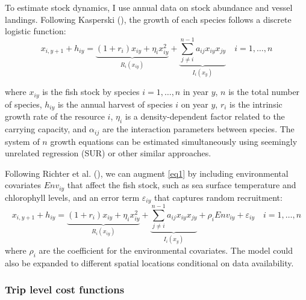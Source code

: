 \documentclass[
  11pt,
]{article}
\begin{document}
To estimate stock dynamics, I use annual data on stock abundance and
vessel landings. Following Kasperski
(), the growth of each species
follows a discrete logistic function: \begin{equation}
x_{i,y+1} + h_{iy} = \underbrace{(1 + r_i)x_{iy} + \eta_i x_{iy}^2}_{R_i(x_{iy})} + \underbrace{\sum_{j \neq i}^{n-1} a_{ij} x_{iy} x_{jy}}_{I_i(x_y)} \quad i=1,\ldots,n
\label{eq1}
\end{equation}

where \(x_{iy}\) is the fish stock by species \(i=1,\ldots,n\) in year
\(y\), \(n\) is the total number of species, \(h_{iy}\) is the annual
harvest of species \(i\) on year \(y\), \(r_i\) is the intrinsic growth
rate of the resource \(i\), \(\eta_i\) is a density-dependent factor
related to the carrying capacity, and \(\alpha_{ij}\) are the
interaction parameters between species. The system of \(n\) growth
equations can be estimated simultaneously using seemingly unrelated
regression (SUR) or other similar approaches.

Following Richter et al. (), we can
augment \eqref{eq1} by including environmental covariates \(Env_{iy}\)
that affect the fish stock, such as sea surface temperature and
chlorophyll levels, and an error term \(\varepsilon_{iy}\) that captures
random recruitment: \begin{equation}
x_{i,y+1} + h_{iy} = \underbrace{(1 + r_i)x_{iy} + \eta_i x_{iy}^2}_{R_i(x_{iy})} + \underbrace{\sum_{j \neq i}^{n-1} a_{ij} x_{iy} x_{jy}}_{I_i(x_y)} + \rho_i Env_{iy} + \varepsilon_{iy} \quad i=1,\ldots,n
\label{eq2}
\end{equation} where \(\rho_i\) are the coefficient for the
environmental covariates. The model could also be expanded to different
spatial locations conditional on data availability.

\subsubsection{Trip level cost
functions}\label{trip-level-cost-functions}
\end{document}
